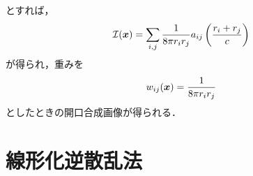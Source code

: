とすれば，
\begin{equation}
	{\cal I}(\mbox{\boldmath $x$})
	=
	\sum_{i,j} \frac{1}{8\pi r_ir_j} a_{ij} \left(\frac{r_i+r_j}{c}\right)
	\label{eqn:XXX_35}
\end{equation}
が得られ，重みを
\begin{equation}
	w_{ij}(\mbox{\boldmath $x$})=\frac{1}{8\pi r_ir_j} 
	\label{eqn:XXX_36}
\end{equation}
としたときの開口合成画像が得られる．











\section{線形化逆散乱法}
